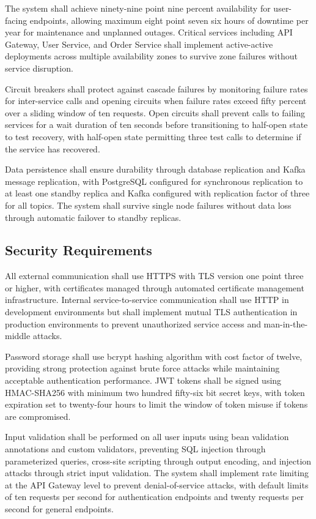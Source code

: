 The system shall achieve ninety-nine point nine percent availability for user-facing endpoints, allowing maximum eight point seven six hours of downtime per year for maintenance and unplanned outages. Critical services including API Gateway, User Service, and Order Service shall implement active-active deployments across multiple availability zones to survive zone failures without service disruption.

Circuit breakers shall protect against cascade failures by monitoring failure rates for inter-service calls and opening circuits when failure rates exceed fifty percent over a sliding window of ten requests. Open circuits shall prevent calls to failing services for a wait duration of ten seconds before transitioning to half-open state to test recovery, with half-open state permitting three test calls to determine if the service has recovered.

Data persistence shall ensure durability through database replication and Kafka message replication, with PostgreSQL configured for synchronous replication to at least one standby replica and Kafka configured with replication factor of three for all topics. The system shall survive single node failures without data loss through automatic failover to standby replicas.

\subsection{Security Requirements}

All external communication shall use HTTPS with TLS version one point three or higher, with certificates managed through automated certificate management infrastructure. Internal service-to-service communication shall use HTTP in development environments but shall implement mutual TLS authentication in production environments to prevent unauthorized service access and man-in-the-middle attacks.

Password storage shall use bcrypt hashing algorithm with cost factor of twelve, providing strong protection against brute force attacks while maintaining acceptable authentication performance. JWT tokens shall be signed using HMAC-SHA256 with minimum two hundred fifty-six bit secret keys, with token expiration set to twenty-four hours to limit the window of token misuse if tokens are compromised.

Input validation shall be performed on all user inputs using bean validation annotations and custom validators, preventing SQL injection through parameterized queries, cross-site scripting through output encoding, and injection attacks through strict input validation. The system shall implement rate limiting at the API Gateway level to prevent denial-of-service attacks, with default limits of ten requests per second for authentication endpoints and twenty requests per second for general endpoints.

